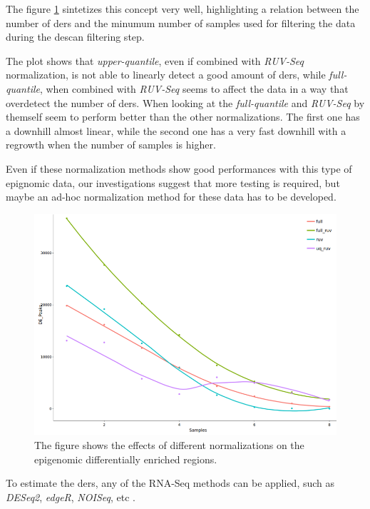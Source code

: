 The figure \ref{fig:normalizationsdescan} sintetizes this concept very well, highlighting a relation between the number of \glspl{der} and the minumum number of samples used for filtering the data during the \gls{descan} filtering step.

The plot shows that \textit{upper-quantile}, even if combined with \textit{RUV-Seq} normalization, is not able to linearly detect a good amount of \glspl{der}, while \textit{full-quantile}, when combined with \textit{RUV-Seq} seems to affect the data in a way that overdetect the number of \glspl{der}. 
When looking at the \textit{full-quantile} and \textit{RUV-Seq} by themself seem to perform better than the other normalizations. The first one has a downhill almost linear, while the second one has a very fast downhill with a regrowth when the number of samples is higher.

Even if these normalization methods show good performances with this type of epignomic data, our investigations suggest that more testing is required, but maybe an ad-hoc normalization method for these data has to be developed.

\begin{figure}[H]
\centering
\includegraphics[width=\textwidth, height=\textheight, keepaspectratio]{img/descan2/normalizations.png}
\caption[Normalizations applied to detected regions]{The figure shows the effects of different normalizations on the epigenomic differentially enriched regions.}
\label{fig:normalizationsdescan}
\centering
\end{figure}

To estimate the \glspl{der}, any of the RNA-Seq methods can be applied, such as \textit{DESeq2}, \textit{edgeR}, \textit{NOISeq}, etc \cite{Robinson2009, McCarthy2012, Tarazona2012}.

